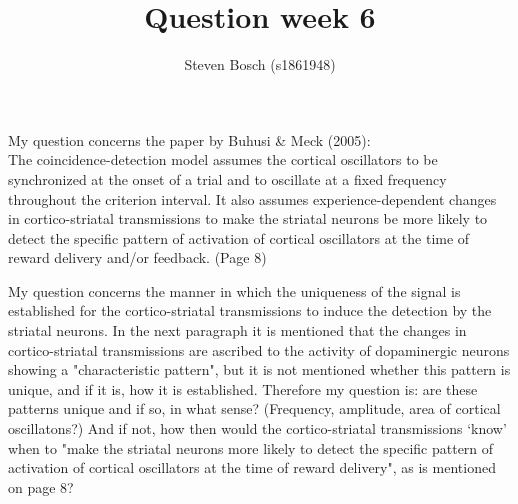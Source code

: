 \documentclass{article}
\title{Question week 6}
\author{Steven Bosch (s1861948)}
\begin{document}
\maketitle
\noindent My question concerns the paper by Buhusi \& Meck (2005):\\

\noindent The coincidence-detection model assumes the cortical oscillators to be synchronized at the onset of a trial and to oscillate at a fixed frequency throughout the criterion interval. It also assumes experience-dependent changes in cortico-striatal transmissions to make the striatal neurons be more likely to detect the specific pattern of activation of cortical oscillators at the time of reward delivery and/or feedback. (Page 8)

My question concerns the manner in which the uniqueness of the signal is established for the cortico-striatal transmissions to induce the detection by the striatal neurons. In the next paragraph it is mentioned that the changes in cortico-striatal transmissions are ascribed to the activity of dopaminergic neurons showing a "characteristic pattern", but it is not mentioned whether this pattern is unique, and if it is, how it is established. Therefore my question is: are these patterns unique and if so, in what sense? (Frequency, amplitude, area of cortical oscillatons?) And if not, how then would the cortico-striatal transmissions `know' when to "make the striatal neurons more likely to detect the specific pattern of activation of cortical oscillators at the time of reward delivery", as is mentioned on page 8?
\end{document}
